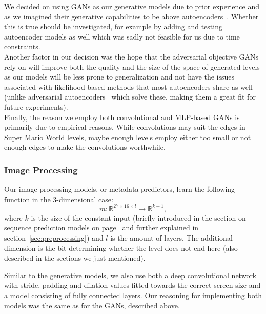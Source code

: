 We decided on using GANs as our generative models due to prior
experience and as we imagined their generative capabilities to be
above
autoencoders~\cite{kramerNonlinearPrincipalComponent1991,kingmaAutoEncodingVariationalBayes2014,Autoencoder2019}.
Whether this is true should be investigated, for example by adding and
testing autoencoder models as well which was sadly not feasible for us
due to time constraints. \\
Another factor in our decision was the hope that the adversarial
objective GANs rely on will improve both the quality and the size of
the space of generated levels as our models will be less prone to
generalization and not have the issues associated with
likelihood-based methods that most autoencoders share as well (unlike
adversarial autoencoders~\cite{makhzaniAdversarialAutoencoders2016}
which solve these, making them a great fit for future experiments). \\
Finally, the reason we employ both convolutional and MLP-based GANs is
primarily due to empirical reasons. While convolutions may suit the
edges in Super Mario World levels, maybe enough levels employ either
too small or not enough edges to make the convolutions worthwhile.

\subsubsection{Image Processing}
\label{sec:image-processing}

Our image processing models, or metadata predictors, learn the
following function in the 3-dimensional case:
\begin{equation*}
  m: \mathbb{R}^{27 \times 16 \times l} \to \mathbb{R}^{k + 1},
\end{equation*}
where $k$ is the size of the constant input (briefly introduced in the
section on sequence prediction models on
page~\pageref{sec:sequence-prediction} and further explained in
section~\ref{sec:preprocessing}) and $l$ is the amount of layers. The
additional dimension is the bit determining whether the level does not
end here (also described in the sections we just mentioned).

Similar to the generative models, we also use both a deep
convolutional network with stride, padding and dilation values fitted
towards the correct screen size and a model consisting of fully
connected layers. Our reasoning for implementing both models was the
same as for the GANs, described above.

